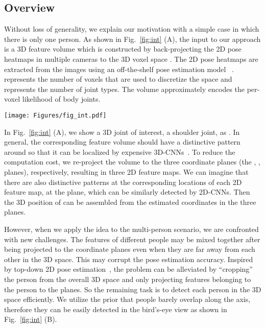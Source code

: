 \label{sec:method}




\subsection{Overview}
Without loss of generality, we explain our motivation with a simple case in which there is only one person. As shown in Fig.~\ref{fig:int} (A), the input to our approach is a 3D feature volume  which is constructed by back-projecting the 2D pose heatmaps in multiple cameras to the 3D voxel space \cite{voxelpose}. The 2D pose heatmaps are extracted from the images using an off-the-shelf pose estimation model ~\cite{sun2019deep}.  represents the number of voxels that are used to discretize the space and  represents the number of joint types. The volume approximately encodes the per-voxel likelihood of body joints. 

\begin{figure*}[t]
  \centering
  \texttt{[image: Figures/fig\_int.pdf]}
  \caption{\textbf{Problem Decomposition.} (A): Considering a single person, we re-project its feature volume to the coordinate planes with orthographic projection. The partial coordinates can be estimated by 2D CNN and assembled to 3D estimation. (B): Multi-person brings the extra challenge of ambiguity and occlusion. Nonetheless, people can be easily isolated from the bird's-eye view of the aggregated feature volume. Based on the intuitive ideas, we develop the lightweight \textit{Joint Localization Networks} and \textit{Human Detection Networks} respectively. }
  \label{fig:int}
\end{figure*}


In Fig.~\ref{fig:int} (A), we show a 3D joint of interest, \eg a shoulder joint, as . In general, the corresponding feature volume should have a distinctive pattern around  so that it can be localized by expensive 3D-CNNs~\cite{voxelpose}. To reduce the computation cost, we re-project the volume to the three coordinate planes (\ie the , ,  planes), respectively, resulting in three 2D feature maps. We can imagine that there are also distinctive patterns at the corresponding locations of each 2D feature map, \eg  at the  plane, which can be similarly detected by 2D-CNNs. Then the 3D position of  can be assembled from the estimated coordinates in the three planes. 

However, when we apply the idea to the multi-person scenario, we are confronted with new challenges. The features of different people may be mixed together after being projected to the coordinate planes even when they are far away from each other in the 3D space. This may corrupt the pose estimation accuracy. Inspired by top-down 2D pose estimation~\cite{fang2017rmpe}, the problem can be alleviated by ``cropping'' the person from the overall 3D space and only projecting features belonging to the person to the planes. So the remaining task is to detect each person in the 3D space efficiently. We utilize the prior that people barely overlap along the  axis, therefore they can be easily detected in the bird's-eye view as shown in Fig.~\ref{fig:int} (B).

